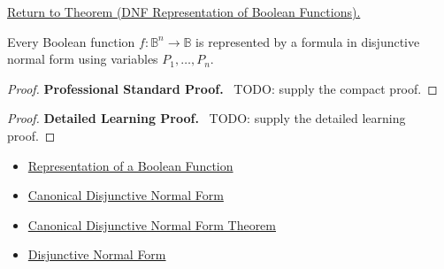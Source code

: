 \newpage
{}
\label{prf:dnf-representation-of-boolean-functions-propositional-logic}

\begin{remark*}[Return]
\hyperref[thm:dnf-representation-of-boolean-functions-propositional-logic]{Return to Theorem (DNF Representation of Boolean Functions).}
\end{remark*}

\begin{theorem*}
Every Boolean function \(f:\mathbb{B}^n\to\mathbb{B}\) is represented by a
formula in disjunctive normal form using variables \(P_1,\ldots,P_n\).
\end{theorem*}

\begin{proof}
\textbf{Professional Standard Proof.}~
TODO: supply the compact proof.
\end{proof}

\begin{proof}
\textbf{Detailed Learning Proof.}~
TODO: supply the detailed learning proof.
\end{proof}

\begin{remark*}
\end{remark*}

\begin{dependencies}
\begin{itemize}
  \item \hyperref[def:boolean-function-representation-propositional-logic]{Representation of a Boolean Function}
  \item \hyperref[def:canonical-disjunctive-normal-form-propositional-logic]{Canonical Disjunctive Normal Form}
  \item \hyperref[thm:canonical-disjunctive-normal-form-propositional-logic]{Canonical Disjunctive Normal Form Theorem}
  \item \hyperref[def:disjunctive-normal-form-propositional-logic]{Disjunctive Normal Form}
\end{itemize}
\end{dependencies}

\clearpage
